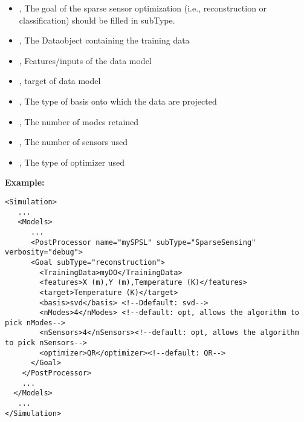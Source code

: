 \begin{itemize}
	\item {}, The goal of the sparse sensor optimization (i.e., reconstruction or classification) should be filled in subType.
	\item {}, The Dataobject containing the training data
	\item {}, Features/inputs of the data model
	\item {}, target of data model
	\item {}, The type of basis onto which the data are projected
	\item {}, The number of modes retained
	\item {}, The number of sensors used
	\item {}, The type of optimizer used
\end{itemize}

\textbf{Example:}
\begin{lstlisting}[style=XML]
<Simulation>
   ...
   <Models>
      ...
      <PostProcessor name="mySPSL" subType="SparseSensing" verbosity="debug">
      <Goal subType="reconstruction">
        <TrainingData>myDO</TrainingData>
        <features>X (m),Y (m),Temperature (K)</features>
        <target>Temperature (K)</target>
        <basis>svd</basis> <!--Ddefault: svd-->
        <nModes>4</nModes> <!--default: opt, allows the algorithm to pick nModes-->
        <nSensors>4</nSensors><!--default: opt, allows the algorithm to pick nSensors-->
        <optimizer>QR</optimizer><!--default: QR-->
      </Goal>
    </PostProcessor>
    ...
  </Models>
   ...
</Simulation>
\end{lstlisting}